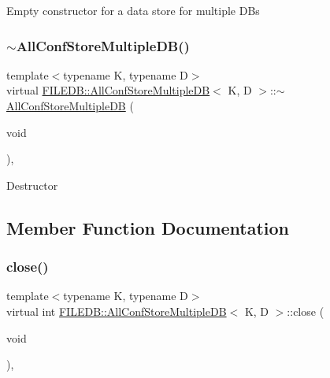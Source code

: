 Empty constructor for a data store for multiple D\+Bs \mbox{\label{classFILEDB_1_1AllConfStoreMultipleDB_a88489be8d488c6fe3a88312f200e7fdd}} 
\subsubsection{\texorpdfstring{$\sim$AllConfStoreMultipleDB()}{~AllConfStoreMultipleDB()}\hspace{0.1cm}{\footnotesize\ttfamily [2/2]}}
{\footnotesize\ttfamily template$<$typename K, typename D$>$ \\
virtual \mbox{\hyperlink{classFILEDB_1_1AllConfStoreMultipleDB}{F\+I\+L\+E\+D\+B\+::\+All\+Conf\+Store\+Multiple\+DB}}$<$ K, D $>$\+::$\sim$\mbox{\hyperlink{classFILEDB_1_1AllConfStoreMultipleDB}{All\+Conf\+Store\+Multiple\+DB}} (\begin{DoxyParamCaption}\item[{void}]{ }\end{DoxyParamCaption})\hspace{0.3cm}{\ttfamily [inline]}, {\ttfamily [virtual]}}

Destructor 

\subsection{Member Function Documentation}
\mbox{\label{classFILEDB_1_1AllConfStoreMultipleDB_a71aed1deeb31450afee4b692941dbae1}} 
\subsubsection{\texorpdfstring{close()}{close()}\hspace{0.1cm}{\footnotesize\ttfamily [1/2]}}
{\footnotesize\ttfamily template$<$typename K, typename D$>$ \\
virtual int \mbox{\hyperlink{classFILEDB_1_1AllConfStoreMultipleDB}{F\+I\+L\+E\+D\+B\+::\+All\+Conf\+Store\+Multiple\+DB}}$<$ K, D $>$\+::close (\begin{DoxyParamCaption}\item[{void}]{ }\end{DoxyParamCaption})\hspace{0.3cm}{\ttfamily [inline]}, {\ttfamily [virtual]}}

